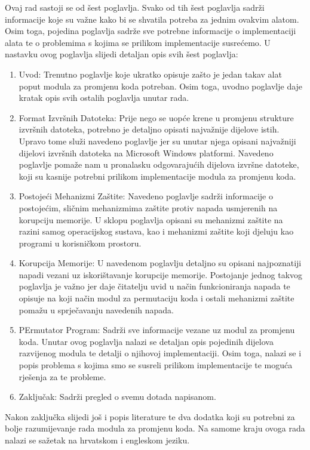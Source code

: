 \documentclass[times, utf8, diplomski, numeric]{fer}
\begin{document}
Ovaj rad sastoji se od šest poglavlja. Svako od tih šest poglavlja sadrži informacije koje su važne kako bi se shvatila potreba za jednim ovakvim alatom. Osim toga, pojedina poglavlja sadrže sve potrebne informacije o implementaciji alata te o problemima s kojima se prilikom implementacije susrećemo. U nastavku ovog poglavlja slijedi detaljan opis svih šest poglavlja:
\begin{enumerate}
\item Uvod: Trenutno poglavlje koje ukratko opisuje zašto je jedan takav alat poput modula za promjenu koda potreban. Osim toga, uvodno poglavlje daje kratak opis svih ostalih poglavlja unutar rada.
\item Format Izvršnih Datoteka: Prije nego se uopće krene u promjenu strukture izvršnih datoteka, potrebno je detaljno opisati najvažnije dijelove istih. Upravo tome služi navedeno poglavlje jer su unutar njega opisani najvažniji dijelovi izvršnih datoteka na Microsoft Windows platformi. Navedeno poglavlje pomaže nam u pronalasku odgovarajućih dijelova izvršne datoteke, koji su kasnije potrebni prilikom implementacije modula za promjenu koda.
\item Postojeći Mehanizmi Zaštite: Navedeno poglavlje sadrži informacije o postojećim, sličnim mehanizmima zaštite protiv napada usmjerenih na korupciju memorije. U sklopu poglavlja opisani su mehanizmi zaštite na razini samog operacijskog sustava, kao i mehanizmi zaštite koji djeluju kao programi u korisničkom prostoru.
\item Korupcija Memorije: U navedenom poglavlju detaljno su opisani najpoznatiji napadi vezani uz iskorištavanje korupcije memorije. Postojanje jednog takvog poglavlja je važno jer daje čitatelju uvid u način funkcioniranja napada te opisuje na koji način modul za permutaciju koda i ostali mehanizmi zaštite pomažu u sprječavanju navedenih napada.
\item PErmutator Program: Sadrži sve informacije vezane uz modul za promjenu koda. Unutar ovog poglavlja nalazi se detaljan opis pojedinih dijelova razvijenog modula te detalji o njihovoj implementaciji. Osim toga, nalazi se i popis problema s kojima smo se susreli prilikom implementacije te moguća rješenja za te probleme.
\item Zaključak: Sadrži pregled o svemu dotada napisanom.
\end{enumerate}
Nakon zaključka slijedi još i popis literature te dva dodatka koji su potrebni za bolje razumijevanje rada modula za promjenu koda. Na samome kraju ovoga rada nalazi se sažetak na hrvatskom i engleskom jeziku.
\end{document}
